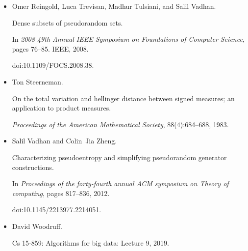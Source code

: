 \documentclass[10pt,a4paper]{article}
\begin{document}
\begin{itemize}
doi:10.1007/978-3-642-11799-2\_15.





\item[] 
[14]

Omer Reingold, Luca Trevisan, Madhur Tulsiani, and Salil Vadhan.


Dense subsets of pseudorandom sets.


In \emph{2008 49th Annual IEEE Symposium on Foundations of Computer
Science}, pages 76–85. IEEE, 2008.


doi:10.1109/FOCS.2008.38.





\item[] 
[15]

Ton Steerneman.


On the total variation and hellinger distance between signed
measures; an application to product measures.


\emph{Proceedings of the American Mathematical Society},
88(4):684–688, 1983.





\item[] 
[16]

Salil Vadhan and Colin Jia Zheng.


Characterizing pseudoentropy and simplifying pseudorandom generator
constructions.


In \emph{Proceedings of the forty-fourth annual ACM symposium on
Theory of computing}, pages 817–836, 2012.


doi:10.1145/2213977.2214051.





\item[] 
[17]

David Woodruff.


Cs 15-859: Algorithms for big data: Lecture 9, 2019.





\end{itemize}
\end{document}
